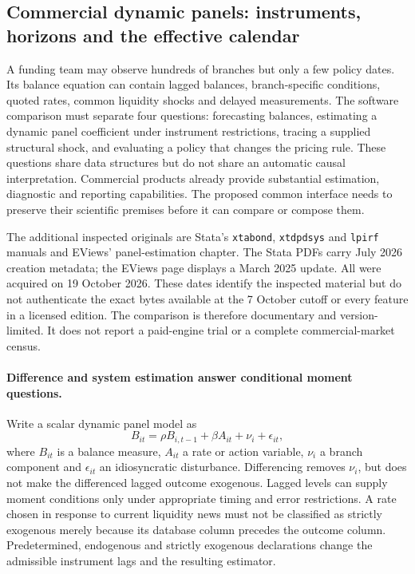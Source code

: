 \label{exec13:commercial-temporal-end}


\subsection{Commercial dynamic panels: instruments, horizons and the effective calendar}
\label{exec19:dynamic-scope}

A funding team may observe hundreds of branches but only a few policy dates.
Its balance equation can contain lagged balances, branch-specific conditions,
quoted rates, common liquidity shocks and delayed measurements. The software
comparison must separate four questions: forecasting balances, estimating a
dynamic panel coefficient under instrument restrictions, tracing a supplied
structural shock, and evaluating a policy that changes the pricing rule.
These questions share data structures but do not share an automatic causal
interpretation. Commercial products already provide substantial estimation,
diagnostic and reporting capabilities. The proposed common interface needs
to preserve their scientific premises before it can compare or compose them.

The additional inspected originals are Stata's \texttt{xtabond},
\texttt{xtdpdsys} and \texttt{lpirf} manuals and EViews' panel-estimation
chapter. The Stata PDFs carry July 2026 creation metadata; the EViews page
displays a March 2025 update. All were acquired on 19 October 2026. These
dates identify the inspected material but do not authenticate the exact bytes
available at the 7 October cutoff or every feature in a licensed edition.
The comparison is therefore documentary and version-limited. It does not
report a paid-engine trial or a complete commercial-market census.
\citep{exec19_dynamic_stata_ab,exec19_dynamic_stata_system,
exec19_dynamic_stata_lp,exec19_dynamic_eviews_panel}

\paragraph{Difference and system estimation answer conditional moment questions.}
Write a scalar dynamic panel model as
\begin{equation}
 B_{it}=\rho B_{i,t-1}+\beta A_{it}+\nu_i+\epsilon_{it},
 \label{exec19:dynamic-model}
\end{equation}
where $B_{it}$ is a balance measure, $A_{it}$ a rate or action variable,
$\nu_i$ a branch component and $\epsilon_{it}$ an idiosyncratic disturbance.
Differencing removes $\nu_i$, but does not make the differenced lagged
outcome exogenous. Lagged levels can supply moment conditions only under
appropriate timing and error restrictions. A rate chosen in response to
current liquidity news must not be classified as strictly exogenous merely
because its database column precedes the outcome column. Predetermined,
endogenous and strictly exogenous declarations change the admissible
instrument lags and the resulting estimator.


